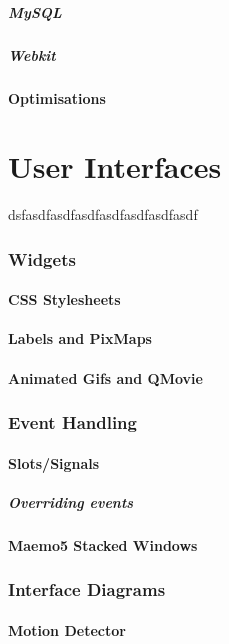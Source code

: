 \documentclass[11pt]{article} %
\begin{document}
\subsubsection{MySQL}
\subsubsection{Webkit}
\subsection{Optimisations}


\part{User Interfaces}{dsfasdfasdfasdfasdfasdfasdfasdf}
\section{Widgets}
\subsection{CSS Stylesheets}
\subsection{Labels and PixMaps}
\subsection{Animated Gifs and QMovie}
\section{Event Handling}
\subsection{Slots/Signals}
\subsubsection{Overriding events}
\subsection{Maemo5 Stacked Windows}
\section{Interface Diagrams}
\subsection{Motion Detector}
\end{document}
